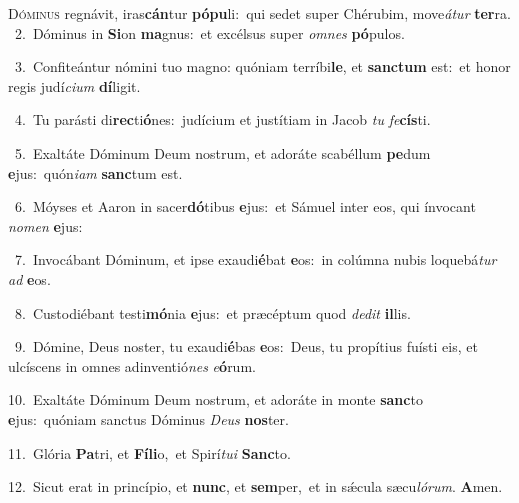 \lettrine{\initial\textcolor{\initialcolor}{D}}{óminus} regnávit, iras\-\textbf{cán}\-tur \textbf{pó}\-\textbf{pu}li:~\star qui sedet super Chérubim, move\-\textit{á}\-\textit{tur} \textbf{ter}\-ra.\\
{\numbfont\textcolor{\numbcolor}{~2.}}~Dóminus in \textbf{Si}\-on \textbf{ma}\-gnus:~\star et excélsus super \textit{om}\-\textit{nes} \textbf{pó}\-pulos.\par
{\numbfont\textcolor{\numbcolor}{~3.}}~Confiteántur nómini tuo magno: quóniam terríbi\-\textbf{le}\-, et \textbf{sanc}\-\textbf{tum} est:~\star et honor regis judí\-\textit{ci}\-\textit{um} \textbf{dí}\-ligit.\par
{\numbfont\textcolor{\numbcolor}{~4.}}~Tu parásti di\-\textbf{rec}\-ti\-\textbf{ó}\-nes:~\star judícium et justítiam in Jacob \textit{tu} \textit{fe}\-\textbf{cís}ti.\par
{\numbfont\textcolor{\numbcolor}{~5.}}~Exaltáte Dóminum Deum nostrum, et adoráte scabéllum \textbf{pe}\-dum \textbf{e}\-jus:~\star quón\-\textit{i}\-\textit{am} \textbf{sanc}\-tum est.\par
{\numbfont\textcolor{\numbcolor}{~6.}}~Móyses et Aaron in sacer\-\textbf{dó}\-tibus \textbf{e}\-jus:~\star et Sámuel inter eos, qui ínvocant \textit{no}\-\textit{men} \textbf{e}\-jus:\par
{\numbfont\textcolor{\numbcolor}{~7.}}~Invocábant Dóminum, et ipse exaudi\-\textbf{é}\-bat \textbf{e}\-os:~\star in colúmna nubis loquebá\textit{tur} \textit{ad} \textbf{e}\-os.\par
{\numbfont\textcolor{\numbcolor}{~8.}}~Custodiébant testi\-\textbf{mó}\-nia \textbf{e}\-jus:~\star et præcéptum quod \textit{de}\-\textit{dit} \textbf{il}\-lis.\par
{\numbfont\textcolor{\numbcolor}{~9.}}~Dómine, Deus noster, tu exaudi\-\textbf{é}\-bas \textbf{e}\-os:~\star Deus, tu propítius fuísti eis, et ulcíscens in omnes adinventió\textit{nes} \textit{e}\-\textbf{ó}rum.\par
{\numbfont\textcolor{\numbcolor}{10.}}~Exaltáte Dóminum Deum nostrum, et adoráte in monte \textbf{sanc}\-to \textbf{e}\-jus:~\star quóniam sanctus Dóminus \textit{De}\-\textit{us} \textbf{nos}\-ter.\par
{\numbfont\textcolor{\numbcolor}{11.}}~Glória \textbf{Pa}\-tri, et \textbf{Fí}\-\textbf{li}o,~\star et Spirí\-\textit{tu}\-\textit{i} \textbf{Sanc}\-to.\par
{\numbfont\textcolor{\numbcolor}{12.}}~Sicut erat in princípio, et \textbf{nunc}\-, et \textbf{sem}\-per,~\star et in sǽcula sæcu\-\textit{ló}\-\textit{rum}. \textbf{A}\-men.\par
